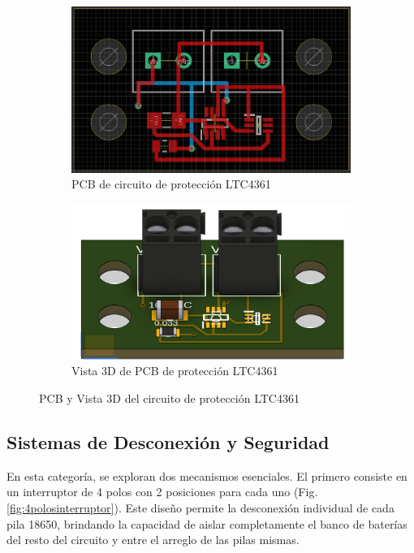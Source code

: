 \begin{figure}[h]
  \centering
  \begin{subfigure}[b]{0.55\textwidth}
    \includegraphics[width=\linewidth]{Pictures/PCB_LTC4361.png}
    \caption{PCB de circuito de protección LTC4361}
    \label{fig:PCB_LTC4361}
  \end{subfigure}%
  \begin{subfigure}[b]{0.55\textwidth}
    \includegraphics[width=\linewidth]{Pictures/3D_LTC4361.png}
    \caption{Vista 3D de PCB de protección LTC4361}
    \label{fig:3D_LTC4361}
  \end{subfigure}
  \caption{PCB y Vista 3D del circuito de protección LTC4361}
  \label{fig:combinada_LTC4361}
\end{figure}

\newpage
\subsection{Sistemas de Desconexión y Seguridad}

En esta categoría, se exploran dos mecanismos esenciales. El primero consiste en un interruptor de 4 polos con 2 posiciones para cada uno (Fig. \ref{fig:4polosinterruptor}). Este diseño permite la desconexión individual de cada pila 18650, brindando la capacidad de aislar completamente el banco de baterías del resto del circuito y entre el arreglo de las pilas mismas.

